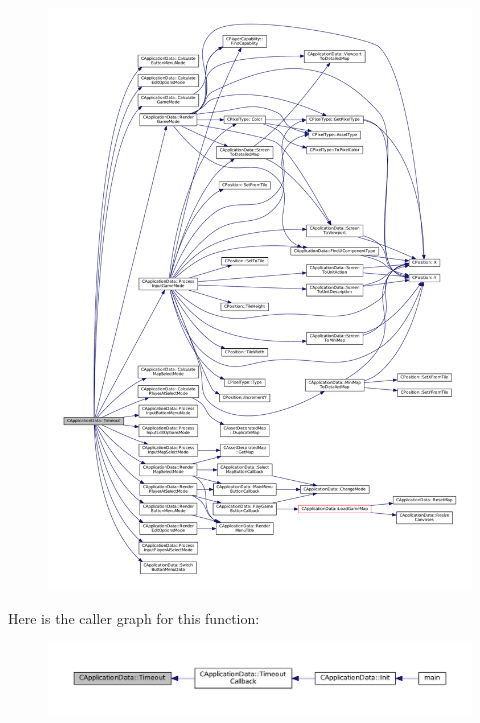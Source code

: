 \begin{figure}[H]
\begin{center}
\leavevmode
\includegraphics[width=350pt]{classCApplicationData_aae0775b38fac01308e8a81b64db49500_cgraph}
\end{center}
\end{figure}
Here is the caller graph for this function\+:\nopagebreak
\begin{figure}[H]
\begin{center}
\leavevmode
\includegraphics[width=350pt]{classCApplicationData_aae0775b38fac01308e8a81b64db49500_icgraph}
\end{center}
\end{figure}
\hypertarget{classCApplicationData_af66e15f6935f053b46a11aaa51a869c9}{}\label{classCApplicationData_af66e15f6935f053b46a11aaa51a869c9} 

